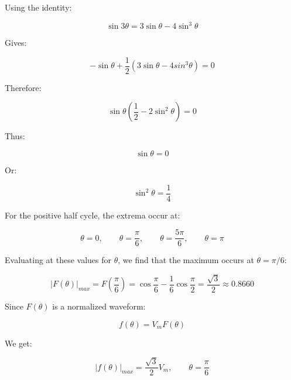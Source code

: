 Using the identity:

\begin{equation}
    \sin3\theta = 3\sin\theta - 4\sin^3\theta
\end{equation}

Gives:

\begin{equation}
    -\sin\theta + \frac{1}{2}(3\sin\theta - 4sin^3\theta) = 0
\end{equation}

Therefore:

\begin{equation}
    \sin\theta\left(\frac{1}{2} - 2\sin^2\theta\right) = 0
\end{equation}

Thus:

\begin{equation}
    \sin\theta = 0 
\end{equation}

Or:

\begin{equation}
    \sin^2\theta = \frac{1}{4}
\end{equation}

For the positive half cycle, the extrema occur at:

\begin{equation}
    \theta = 0, \qquad
    \theta = \frac{\pi}{6}, \qquad
    \theta = \frac{5\pi}{6}, \qquad
    \theta = \pi
\end{equation}

Evaluating at these values for $\theta$, we find that the maximum occurs at $\theta = \pi/6$:

\begin{equation}
    |F(\theta)|_{max} = F(\frac{\pi}{6}) = \cos\frac{\pi}{6} - \frac{1}{6}\cos\frac{\pi}{2} = \frac{\sqrt{3}}{2} \approx 0.8660
\end{equation}

Since $F(\theta)$ is a normalized waveform:

\begin{equation}
    f(\theta) = V_mF(\theta)
\end{equation}

We get:

\begin{equation}
    |f(\theta)|_{max} = \frac{\sqrt{3}}{2}V_m, \qquad
    \theta = \frac{\pi}{6}
\end{equation}